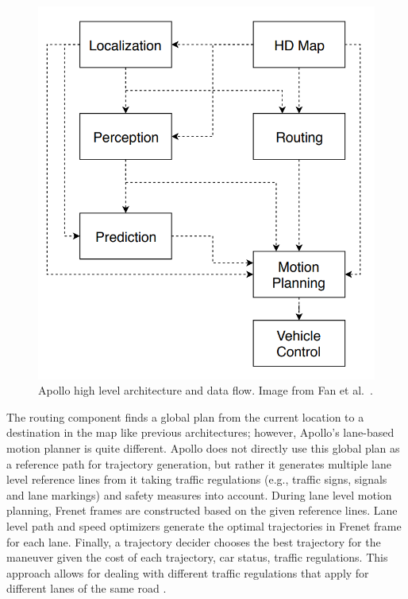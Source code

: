 \begin{figure}[h]
  \centering
  \includegraphics[width=.8\textwidth]{figures/apollo.png}
  \caption[Apollo high level architecture]{Apollo high level architecture and
    data flow. Image from Fan et al.\ \cite{Fan2018BaiduAE}.}
  \label{figure:apollo}
\end{figure}

The routing component finds a global plan from the current location
to a destination in the map like previous architectures; however, Apollo's
lane-based motion planner is quite different. Apollo does not directly use
this global plan as a reference path for trajectory generation, but rather it
generates multiple lane level reference lines from it taking traffic
regulations (e.g., traffic signs, signals and lane markings) and safety
measures into account. During lane level motion planning, Frenet frames are
constructed based on the given reference lines. Lane level path and speed
optimizers generate the optimal trajectories in Frenet frame for each lane.
Finally, a trajectory decider chooses the best trajectory for the maneuver
given the cost of each trajectory, car status, traffic regulations. This
approach allows for dealing with different traffic regulations that apply for
different lanes of the same road \cite{Fan2018BaiduAE}.

